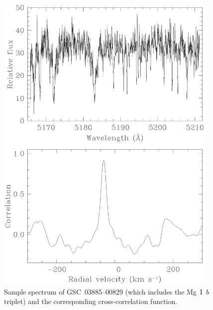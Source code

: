 \begin{figure}
\begin{center}
\includegraphics[width=0.95\textwidth]{3_f3}
\caption[Sample spectrum of the F-dwarf \mbox{GSC 03885--00829}]{Sample spectrum of \mbox{GSC 03885--00829} (which includes the
Mg~\textsc{\small I}~$b$ triplet) and the corresponding cross-correlation function.}\label{cha:gsc:fig:spectrum}
\end{center}
\end{figure}

